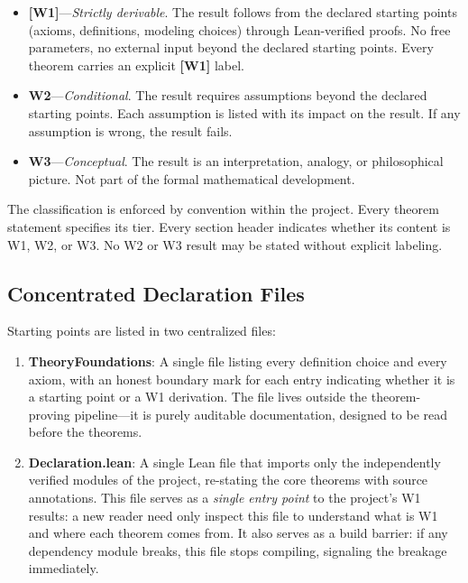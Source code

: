 ﻿\documentclass[11pt]{article}
\newcommand{\wone}[1]{\textcolor{wcolor}{\textbf{[#1]}}}
\begin{document}
\begin{itemize}
\item \wone{W1}---\emph{Strictly derivable}. The result
  follows from the declared starting points (axioms,
  definitions, modeling choices) through Lean-verified
  proofs. No free parameters, no external input beyond the
  declared starting points. Every theorem carries an explicit
  \wone{W1} label.
\item \textbf{W2}---\emph{Conditional}. The result requires
  assumptions beyond the declared starting points. Each
  assumption is listed with its impact on the result. If any
  assumption is wrong, the result fails.
\item \textbf{W3}---\emph{Conceptual}. The result is an
  interpretation, analogy, or philosophical picture. Not part
  of the formal mathematical development.
\end{itemize}

The classification is enforced by convention within the
project. Every theorem statement specifies its tier. Every
section header indicates whether its content is W1, W2, or W3.
No W2 or W3 result may be stated without explicit labeling.

\subsection{Concentrated Declaration Files}
Starting points are listed in two centralized files:

\begin{enumerate}
\item \textbf{TheoryFoundations}: A single file listing every
  definition choice and every axiom, with an honest boundary
  mark for each entry indicating whether it is a starting
  point or a W1 derivation. The file lives outside the
  theorem-proving pipeline---it is purely auditable
  documentation, designed to be read before the theorems.
\item \textbf{Declaration.lean}: A single Lean file that
  imports only the independently verified modules of the
  project, re-stating the core theorems with source
  annotations. This file serves as a \emph{single entry
  point} to the project's W1 results: a new reader need only
  inspect this file to understand what is W1 and where each
  theorem comes from. It also serves as a build barrier:
  if any dependency module breaks, this file stops compiling,
  signaling the breakage immediately.
\end{enumerate}
\end{document}
